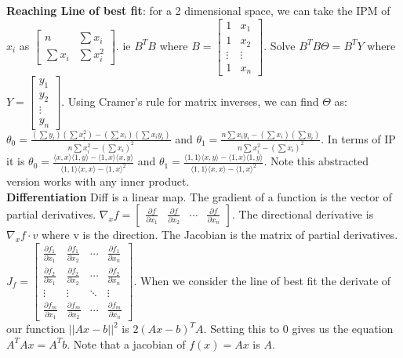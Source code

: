 \documentclass[answers,12pt,addpoints]{exam}
\begin{document}
\textbf{Reaching Line of best fit}: for a 2 dimensional space, we can take the IPM of $x_i$ as $\begin{bmatrix}
    n & \sum x_i \\
    \sum x_i & \sum x_i^2
\end{bmatrix}$. ie $B^T B$ where $B = \begin{bmatrix}
    1 & x_1 \\
    1 & x_2 \\
    \vdots & \vdots \\
    1 & x_n
\end{bmatrix}$. Solve $B^T B \Theta = B^T Y$ where $Y = \begin{bmatrix}
    y_1 \\
    y_2 \\
    \vdots \\
    y_n
\end{bmatrix}$. Using Cramer's rule for matrix inverses, we can find $\Theta$ as:
$\theta_0 = \frac{(\sum y_i )(\sum x^2_i) - (\sum x_i)(\sum x_i y_i)}{n\sum x_i^2 - (\sum x_i)^2} $
and $\theta_1 = \frac{n\sum x_i y_i - (\sum x_i)(\sum y_i)}{n\sum x_i^2 - (\sum x_i)^2}$. In terms of IP it is $\theta_0 = \frac{\langle x,x \rangle \langle 1, y \rangle - \langle 1,x\rangle\langle x,y\rangle}{\langle 1,1 \rangle \langle x,x \rangle - \langle 1,x\rangle^2}$
and $\theta_1 = \frac{\langle 1,1 \rangle \langle x,y \rangle - \langle 1,x\rangle\langle 1,y\rangle}{\langle 1,1 \rangle \langle x,x \rangle - \langle 1,x\rangle^2}$. Note this abstracted version works with any inner product.\\

\textbf{Differentiation} Diff is a linear map. The gradient of a function is the vector of partial derivatives. $\nabla_x f = \begin{bmatrix}
    \frac{\partial f}{\partial x_1} &
    \frac{\partial f}{\partial x_2} &
    \cdots &
    \frac{\partial f}{\partial x_n}
\end{bmatrix}$. The directional derivative is $\nabla_x f \cdot v$ where v is the direction. The Jacobian is the matrix of partial derivatives. $J_f = \begin{bmatrix}
    \frac{\partial f_1}{\partial x_1} & \frac{\partial f_1}{\partial x_2} & \cdots & \frac{\partial f_1}{\partial x_n} \\
    \frac{\partial f_2}{\partial x_1} & \frac{\partial f_2}{\partial x_2} & \cdots & \frac{\partial f_2}{\partial x_n} \\
    \vdots & \vdots & \ddots & \vdots \\
    \frac{\partial f_m}{\partial x_1} & \frac{\partial f_m}{\partial x_2} & \cdots & \frac{\partial f_m}{\partial x_n}
\end{bmatrix}$. When we consider the line of best fit the derivate of our function $||Ax - b||^2$ is $2(Ax - b)^T A$. Setting this to 0 gives us the equation $A^T Ax = A^Tb$. Note that a jacobian of $f(x) = Ax$ is $A$.\\
\end{document}
